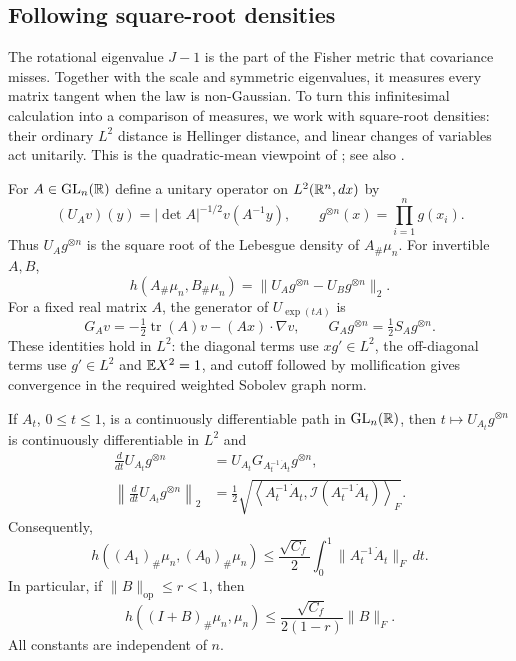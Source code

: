\subsection{Following square-root densities}

The rotational eigenvalue \(J-1\) is the part of the Fisher metric that
covariance misses. Together with the scale and symmetric eigenvalues, it
measures every matrix tangent when the law is non-Gaussian. To turn this
infinitesimal calculation into a comparison of measures, we work with
square-root densities: their ordinary \(L^2\) distance is Hellinger distance,
and linear changes of variables act unitarily. This is the
quadratic-mean viewpoint of \cite[Section~7.2]{vandervaart1998asymptotic};
see also \cite{bogachev1997differentiable,bell1985quasi}.

For $A\in\operatorname{GL}_n(\mathbb R)$ define a unitary operator on
$L^2(\mathbb R^n,dx)$ by
\[
 (U_Av)(y)=|\det A|^{-1/2}v(A^{-1}y),
 \qquad
 g^{\otimes n}(x)=\prod_{i=1}^n g(x_i).
\]
Thus $U_Ag^{\otimes n}$ is the square root of the Lebesgue density of
$A_\#\mu_n$.  For invertible $A,B$,
\[
 h(A_\#\mu_n,B_\#\mu_n)=\|U_Ag^{\otimes n}-U_Bg^{\otimes n}\|_2.
\]
For a fixed real matrix $A$, the generator of $U_{\exp(tA)}$ is
\begin{equation}
 G_Av=-\tfrac12\operatorname{tr}(A)v-(Ax)\cdot\nabla v,
 \qquad G_Ag^{\otimes n}=\tfrac12S_Ag^{\otimes n}.
 \label{eq:half-density-generator}
\end{equation}
These identities hold in \(L^2\): the diagonal terms use \(xg'\in L^2\), the
off-diagonal terms use \(g'\in L^2\) and \(\mathbb E X^2=1\), and cutoff followed by
mollification gives convergence in the required weighted Sobolev graph norm.

\begin{lemma}
\label{lem:finite-hellinger-upper}
If $A_t$, $0\le t\le1$, is a continuously differentiable path in
$\operatorname{GL}_n(\mathbb R)$, then $t\mapsto U_{A_t}g^{\otimes n}$ is continuously
differentiable in $L^2$ and
\begin{equation}
 \begin{aligned}
 \frac d{dt}U_{A_t}g^{\otimes n}
 &=U_{A_t}G_{A_t^{-1}\dot A_t}g^{\otimes n},\\
 \left\|\frac d{dt}U_{A_t}g^{\otimes n}\right\|_2
 &=\frac12\sqrt{\left\langle A_t^{-1}\dot A_t,
                  \mathcal I(A_t^{-1}\dot A_t)\right\rangle_F}.
 \end{aligned}
\end{equation}
Consequently,
\begin{equation}
 h((A_1)_\#\mu_n,(A_0)_\#\mu_n)
 \le\frac{\sqrt{C_f}}2
       \int_0^1\|A_t^{-1}\dot A_t\|_F\,dt.
 \label{eq:finite-hellinger-path}
\end{equation}
In particular, if $\|B\|_{\mathrm{op}}\le r<1$, then
\begin{equation}
 h((I+B)_\#\mu_n,\mu_n)
 \le\frac{\sqrt{C_f}}{2(1-r)}\|B\|_F.
 \label{eq:finite-hellinger-upper}
\end{equation}
All constants are independent of $n$.
\end{lemma}

